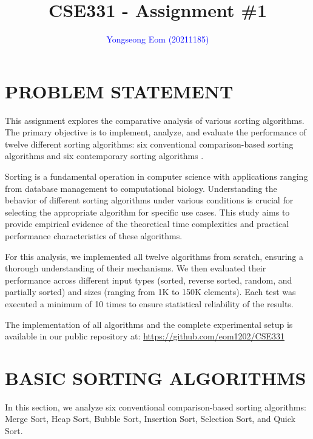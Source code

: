 \documentclass[sigconf]{acmart}
\begin{document}
\title{CSE331 - Assignment \#1}

\author{\textcolor{blue}{Yongseong Eom (20211185)}}

\renewcommand{\shortauthors}{\textcolor{blue}{Eom et al.}}

\renewcommand\footnotetextcopyrightpermission[1]{} %

\maketitle

\section{PROBLEM STATEMENT}
This assignment explores the comparative analysis of various sorting algorithms. The primary objective is to implement, analyze, and evaluate the performance of twelve different sorting algorithms: six conventional comparison-based sorting algorithms and six contemporary sorting algorithms \cite{knuth1998art}.

Sorting is a fundamental operation in computer science with applications ranging from database management to computational biology. Understanding the behavior of different sorting algorithms under various conditions is crucial for selecting the appropriate algorithm for specific use cases. This study aims to provide empirical evidence of the theoretical time complexities and practical performance characteristics of these algorithms.

For this analysis, we implemented all twelve algorithms from scratch, ensuring a thorough understanding of their mechanisms. We then evaluated their performance across different input types (sorted, reverse sorted, random, and partially sorted) and sizes (ranging from 1K to 150K elements). Each test was executed a minimum of 10 times to ensure statistical reliability of the results.

The implementation of all algorithms and the complete experimental setup is available in our public repository at: \url{https://github.com/eom1202/CSE331}

\section{BASIC SORTING ALGORITHMS}
In this section, we analyze six conventional comparison-based sorting algorithms: Merge Sort, Heap Sort, Bubble Sort, Insertion Sort, Selection Sort, and Quick Sort.
\end{document}
